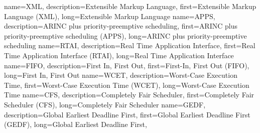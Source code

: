 {%
    name={XML},
    description={Extensible Markup Language},
    first={Extensible Markup Language (XML)},
    long={Extensible Markup Language}
}
{%
    name={APPS},
    description={ARINC plus priority-preemptive scheduling},
    first={ARINC plus priority-preemptive scheduling (APPS)},
    long={ARINC plus priority-preemptive scheduling}
}
{%
    name={RTAI},
    description={Real Time Application Interface},
    first={Real Time Application Interface (RTAI)},
    long={Real Time Application Interface}
}
{%
    name={FIFO},
    description={First In, First Out},
    first={First-In, First Out (FIFO)},
    long={First In, First Out}
}
{%
    name={WCET},
    description={Worst-Case Execution Time},
    first={Worst-Case Execution Time (WCET)},
    long={Worst-Case Execution Time}
}
{%
    name={CFS},
    description={Completely Fair Scheduler},
    first={Completely Fair Scheduler (CFS)},
    long={Completely Fair Scheduler}
}
{%
    name={GEDF},
    description={Global Earliest Deadline First},
    first={Global Earliest Deadline First (GEDF)},
    long={Global Earliest Deadline First},
}